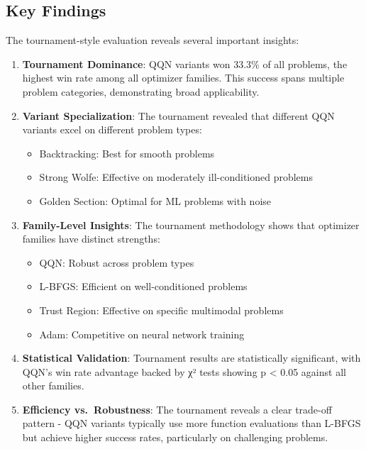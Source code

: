 \hypertarget{key-findings}{%
\subsection{Key Findings}\label{key-findings}}

The tournament-style evaluation reveals several important insights:

\begin{enumerate}
\def\labelenumi{\arabic{enumi}.}
\item
  \textbf{Tournament Dominance}: QQN variants won 33.3\% of all problems, the highest win rate among all optimizer families. This success spans multiple problem categories, demonstrating broad applicability.
\item
  \textbf{Variant Specialization}: The tournament revealed that different QQN variants excel on different problem types:

  \begin{itemize}
  \tightlist
  \item
    Backtracking: Best for smooth problems
  \item
    Strong Wolfe: Effective on moderately ill-conditioned problems
  \item
    Golden Section: Optimal for ML problems with noise
  \end{itemize}
\item
  \textbf{Family-Level Insights}: The tournament methodology shows that optimizer families have distinct strengths:

  \begin{itemize}
  \tightlist
  \item
    QQN: Robust across problem types
  \item
    L-BFGS: Efficient on well-conditioned problems
  \item
    Trust Region: Effective on specific multimodal problems
  \item
    Adam: Competitive on neural network training
  \end{itemize}
\item
  \textbf{Statistical Validation}: Tournament results are statistically significant, with QQN's win rate advantage backed by χ² tests showing p \textless{} 0.05 against all other families.
\item
  \textbf{Efficiency vs.~Robustness}: The tournament reveals a clear trade-off pattern - QQN variants typically use more function evaluations than L-BFGS but achieve higher success rates, particularly on challenging problems.
\end{enumerate}

